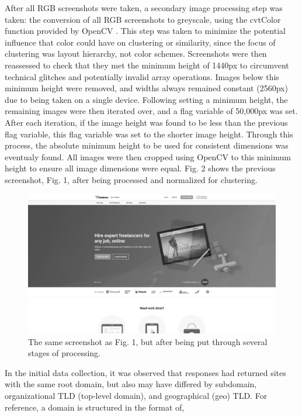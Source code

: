 \documentclass[conference]{IEEEtran}
\begin{document}
After all RGB screenshots were taken, a secondary image processing step was taken: the conversion of all RGB screenshots to greyscale, using the cvtColor function provided by OpenCV \cite{cv2color}. This step was taken to minimize the potential influence that color could have on clustering or similarity, since the focus of clustering was layout hierarchy, not color schemes. 
Screenshots were then reassessed to check that they met the minimum height of 1440px to circumvent technical glitches and potentially invalid array operations. Images below this minimum height were removed, and widths always remained constant (2560px) due to being taken on a single device. Following setting a minimum height, the remaining images were then iterated over, and a flag variable of 50,000px was set. After each iteration, if the image height was found to be less than the previous flag variable, this flag variable was set to the shorter image height. Through this process, the absolute minimum height to be used for consistent dimensions was eventualy found. All images were then cropped using OpenCV to this minimum height to ensure all image dimensions were equal. Fig. 2 shows the previous screenshot, Fig. 1, after being processed and normalized for clustering.

\begin{figure}[h]
\centering
\label{fig:greyscale}
\includegraphics[width=\columnwidth]{media/freelancer_com_processed.png}
\caption{The same screenshot as Fig. 1, but after being put through several stages of processing.}
\end{figure}

In the initial data collection, it was observed that responses had returned sites with the same root domain, but also may have differed by subdomain, organizational TLD (top-level domain), and geographical (geo) TLD. For reference, a domain is structured in the format of,
\end{document}
